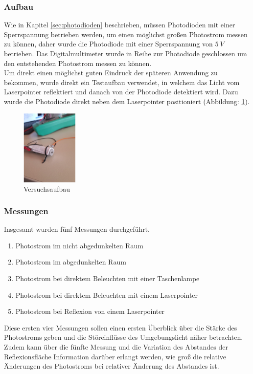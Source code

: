 \subsubsection{Aufbau}
Wie in Kapitel \ref{sec:photodioden} beschrieben, müssen Photodioden mit einer Sperrspannung betrieben werden, um einen möglichst großen Photostrom messen zu können, daher wurde die Photodiode mit einer Sperrspannung von $5\:V$ betrieben. Das Digitalmultimeter wurde in Reihe zur Photodiode geschlossen um den entstehenden Photostrom messen zu können.\\
Um direkt einen möglichst guten Eindruck der späteren Anwendung zu bekommen, wurde direkt ein Testaufbau verwendet, in welchem das Licht vom Laserpointer reflektiert und danach von der Photodiode detektiert wird. Dazu wurde die Photodiode direkt neben dem Laserpointer positioniert (Abbildung: \ref{versuch1_versuchsaufbau}). 
\begin{figure}[H]
	\centering
	\includegraphics[width=0.25\textwidth]{images/Machbarkeitsstudie/Versuch1_Aufbau}	
	\caption{Versuchsaufbau}
	\label{versuch1_versuchsaufbau}
\end{figure}
\subsubsection{Messungen}
Insgesamt wurden fünf Messungen durchgeführt.
\begin{enumerate}
	\item Photostrom im nicht abgedunkelten Raum
	\item Photostrom im abgedunkelten Raum
	\item Photostrom bei direktem Beleuchten mit einer Taschenlampe
	\item Photostrom bei direktem Beleuchten mit einem Laserpointer
	\item Photostrom bei Reflexion von einem Laserpointer
\end{enumerate}
Diese ersten vier Messungen sollen einen ersten Überblick über die Stärke des Photostroms geben und die Störeinflüsse des Umgebungslicht näher betrachten. Zudem kann über die fünfte Messung und die Variation des Abstandes der Reflexionsfläche Information darüber erlangt werden, wie groß die relative Änderungen des Photostroms bei relativer Änderung des Abstandes ist.
